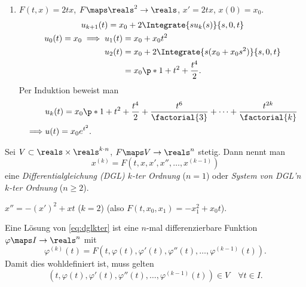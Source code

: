\begin{beispiele*}
\begin{enumerate}
\begin{behauptung*}
\begin{align*}
       \end{align*}
     \end{behauptung*}
     \begin{proof}
      per Induktion       
     \end{proof}
     \begin{equation*}
       \implies x(t)=\begin{pNiceMatrix} \Cos{t} \\ \Sin{t} \end{pNiceMatrix}
     \end{equation*}
     \item \( F(t,x)=2tx \), \( F\maps \reals^2\to \reals \), \( x'=2tx \), \( x(0)=x_0 \).
     \begin{gather*}
       u_{k+1}(t)=x_0+2\Integrate{su_k(s)}{s,0,t}\\
       u_0(t)=x_0\implies \begin{aligned}[t]
         u_1(t)&=x_0+x_0t^2\\
         u_2(t)&=x_0+2\Integrate{s(x_0+x_0s^2)}{s,0,t}\\
         &=x_0\p*{ 1+t^2+\frac{t^4}{2} }.
       \end{aligned}
     \end{gather*}
     Per Induktion beweist man
     \begin{align*}
       &u_k(t)=x_0\p*{ 1+t^2+\frac{t^4}{2}+\frac{t^6}{\factorial{3}}+\dotsb+\frac{t^{2k}}{\factorial{k}} }\\
       \implies &u(t)=x_0 e^{t^2}.
     \end{align*}
   \end{enumerate}
\end{beispiele*}
\begin{definition*}
  Sei \( V\subset \reals\times \reals^{k\cdot n} \), \( F\maps V\to \reals^n \) stetig. Dann nennt man
  \begin{equation*}
    x^{(k)}=F(t,x,x',x'',\dotsc,x^{(k-1)})\tag{\( * \)} \label{eq:dglkter}
  \end{equation*}
  eine \emph{Differentialgleichung (DGL) \( k \)-ter Ordnung} (\( n=1 \)) oder \emph{System von DGL'n \( k \)-ter Ordnung} (\( n\geq 2 \)).
  \begin{beispiel*}
    \( x''=-(x')^2+xt \) (\( k=2 \)) (also \( F(t,x_0,x_1)=-x_1^2+x_0t \)).
  \end{beispiel*}
  Eine Lösung von \eqref{eq:dglkter} ist eine \( n \)-mal differenzierbare Funktion \( \varphi\maps I\to \reals^n \) mit
  \begin{equation*}
    \varphi^{(k)}(t)=F(t,\varphi(t),\varphi'(t),\varphi''(t),\dotsc,\varphi^{(k-1)}(t)).
  \end{equation*}
  Damit dies wohldefiniert ist, muss gelten
  \begin{equation*}
    (t,\varphi(t),\varphi'(t),\varphi''(t),\dotsc,\varphi^{(k-1)}(t))\in V\quad \forall t\in I.
  \end{equation*}
\end{definition*}


